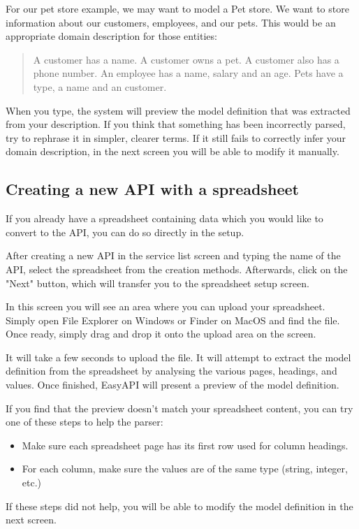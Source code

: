 For our pet store example, we may want to model a Pet store. We want to store information about our customers, employees, and our pets. This would be an appropriate domain description for those entities:

\blockquote{A customer has a name. A customer owns a pet. A customer also has a phone number. An employee has a name, salary and an age. Pets have a type, a name and an customer.}

When you type, the system will preview the model definition that was extracted from your description. If you think that something has been incorrectly parsed, try to rephrase it in simpler, clearer terms. If it still fails to correctly infer your domain description, in the next screen you will be able to modify it manually.

\subsection{Creating a new API with a spreadsheet}
If you already have a spreadsheet containing data which you would like to convert to the API, you can do so directly in the setup.


After creating a new API in the service list screen and typing the name of the API, select the spreadsheet from the creation methods. Afterwards, click on the "Next" button, which will transfer you to the spreadsheet setup screen.


In this screen you will see an area where you can upload your spreadsheet. Simply open File Explorer on Windows or Finder on MacOS and find the file. Once ready, simply drag and drop it onto the upload area on the screen.

It will take a few seconds to upload the file. It will attempt to extract the model definition from the spreadsheet by analysing the various pages, headings, and values. Once finished, EasyAPI will present a preview of the model definition.

If you find that the preview doesn't match your spreadsheet content, you can try one of these steps to help the parser:

\begin{itemize}
\item Make sure each spreadsheet page has its first row used for column headings.
\item For each column, make sure the values are of the same type (string, integer, etc.)
\end{itemize}

If these steps did not help, you will be able to modify the model definition in the next screen.

